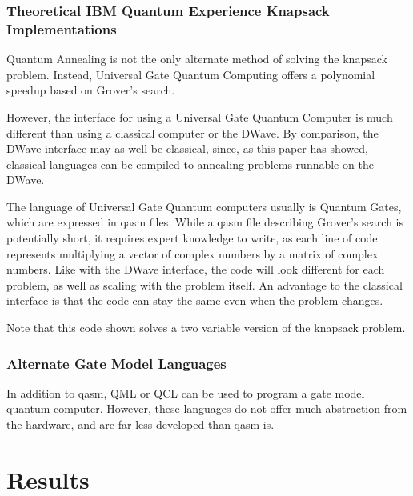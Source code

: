 \documentclass{article}
\begin{document}
\subsubsection{Theoretical IBM Quantum Experience Knapsack Implementations}

Quantum Annealing is not the only alternate method of solving the knapsack problem.
Instead, Universal Gate Quantum Computing offers a polynomial speedup based on Grover's search.

However, the interface for using a Universal Gate Quantum Computer is much different than using a classical computer or the DWave.
By comparison, the DWave interface may as well be classical, since, as this paper has showed, classical languages can be compiled to annealing problems runnable on the DWave.

The language of Universal Gate Quantum computers usually is Quantum Gates, which are expressed in qasm files.
While a qasm file describing Grover's search is potentially short, it requires expert knowledge to write, as each line of code represents multiplying a vector of complex numbers by a matrix of complex numbers.
Like with the DWave interface, the code will look different for each problem, as well as scaling with the problem itself.
An advantage to the classical interface is that the code can stay the same even when the problem changes.       

Note that this code shown solves a two variable version of the knapsack problem.

\lstset{language=C}


\subsubsection{Alternate Gate Model Languages}

In addition to qasm, QML or QCL can be used to program a gate model quantum computer.
However, these languages do not offer much abstraction from the hardware, and are far less developed than qasm is.

\section{Results}
\end{document}
